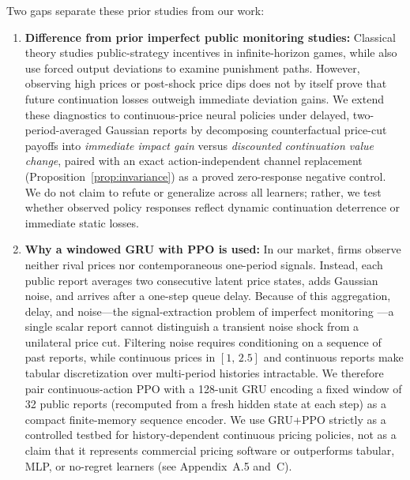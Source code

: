 \documentclass{article}
\begin{document}
Two gaps separate these prior studies from our work:
\begin{enumerate}
\item \textbf{Difference from prior imperfect public monitoring studies:} Classical theory \citep{green1984noncooperative, abreu1990toward, fudenberg1994folk} studies public-strategy incentives in infinite-horizon games, while \citet{calvano2021algorithmic} also use forced output deviations to examine punishment paths. However, observing high prices or post-shock price dips does not by itself prove that future continuation losses outweigh immediate deviation gains. We extend these diagnostics to continuous-price neural policies under delayed, two-period-averaged Gaussian reports by decomposing counterfactual price-cut payoffs into \emph{immediate impact gain} versus \emph{discounted continuation value change}, paired with an exact action-independent channel replacement (Proposition~\ref{prop:invariance}) as a proved zero-response negative control. We do not claim to refute \citet{calvano2021algorithmic} or generalize across all learners; rather, we test whether observed policy responses reflect dynamic continuation deterrence or immediate static losses.
\item \textbf{Why a windowed GRU with PPO is used:} In our market, firms observe neither rival prices nor contemporaneous one-period signals. Instead, each public report averages two consecutive latent price states, adds Gaussian noise, and arrives after a one-step queue delay. Because of this aggregation, delay, and noise---the signal-extraction problem of imperfect monitoring \citep{green1984noncooperative, calvano2021algorithmic}---a single scalar report cannot distinguish a transient noise shock from a unilateral price cut. Filtering noise requires conditioning on a sequence of past reports, while continuous prices in $[1,\,2.5]$ and continuous reports make tabular discretization over multi-period histories intractable. We therefore pair continuous-action PPO \citep{schulman2017proximal} with a 128-unit GRU encoding a fixed window of 32 public reports (recomputed from a fresh hidden state at each step) as a compact finite-memory sequence encoder. We use GRU+PPO strictly as a controlled testbed for history-dependent continuous pricing policies, not as a claim that it represents commercial pricing software or outperforms tabular, MLP, or no-regret learners (see Appendix~A.5 and~C).
\end{enumerate}

\end{document}
